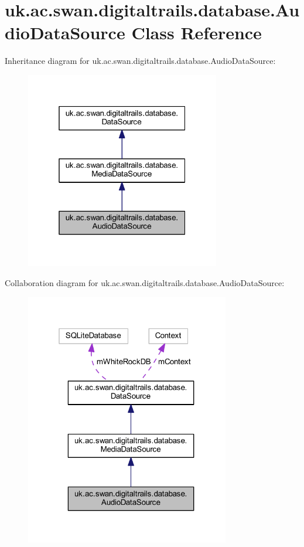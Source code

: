 \hypertarget{classuk_1_1ac_1_1swan_1_1digitaltrails_1_1database_1_1_audio_data_source}{\section{uk.\+ac.\+swan.\+digitaltrails.\+database.\+Audio\+Data\+Source Class Reference}
\label{classuk_1_1ac_1_1swan_1_1digitaltrails_1_1database_1_1_audio_data_source}
}


Inheritance diagram for uk.\+ac.\+swan.\+digitaltrails.\+database.\+Audio\+Data\+Source\+:\nopagebreak
\begin{figure}[H]
\begin{center}
\leavevmode
\includegraphics[width=241pt]{classuk_1_1ac_1_1swan_1_1digitaltrails_1_1database_1_1_audio_data_source__inherit__graph}
\end{center}
\end{figure}


Collaboration diagram for uk.\+ac.\+swan.\+digitaltrails.\+database.\+Audio\+Data\+Source\+:\nopagebreak
\begin{figure}[H]
\begin{center}
\leavevmode
\includegraphics[width=253pt]{classuk_1_1ac_1_1swan_1_1digitaltrails_1_1database_1_1_audio_data_source__coll__graph}
\end{center}
\end{figure}
